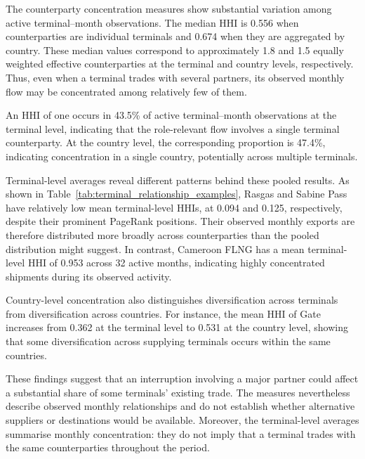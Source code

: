 \documentclass[pdftex,12pt,openright,a4paper,oneside]{book}
\begin{document}
The counterparty concentration measures show substantial variation among active terminal--month observations. 
The median HHI is 0.556 when counterparties are individual terminals and 0.674 when they are aggregated by country. 
These median values correspond to approximately 1.8 and 1.5 equally weighted effective counterparties at the terminal and country levels, respectively. Thus, even when a terminal trades with several partners, its observed monthly flow may be concentrated among relatively few of them.

An HHI of one occurs in 43.5\% of active terminal--month observations at the terminal level, indicating that the role-relevant flow involves a single terminal counterparty. 
At the country level, the corresponding proportion is 47.4\%, indicating concentration in a single country, potentially across multiple terminals.

Terminal-level averages reveal different patterns behind these pooled results. 
As shown in Table~\ref{tab:terminal_relationship_examples}, Rasgas and Sabine Pass have relatively low mean terminal-level HHIs, at 0.094 and 0.125, respectively, despite their prominent PageRank positions. Their observed monthly exports are therefore distributed more broadly across counterparties than the pooled distribution might suggest. In contrast, Cameroon FLNG has a mean terminal-level HHI of 0.953 across 32 active months, indicating highly concentrated shipments during its observed activity.

Country-level concentration also distinguishes diversification across terminals from diversification across countries. 
For instance, the mean HHI of Gate increases from 0.362 at the terminal level to 0.531 at the country level, showing that some diversification across supplying terminals occurs within the same countries.

These findings suggest that an interruption involving a major partner could affect a substantial share of some terminals' existing trade. The measures nevertheless describe observed monthly relationships and do not establish whether alternative suppliers or destinations would be available. Moreover, the terminal-level averages summarise monthly concentration: they do not imply that a terminal trades with the same counterparties throughout the period.
\end{document}
